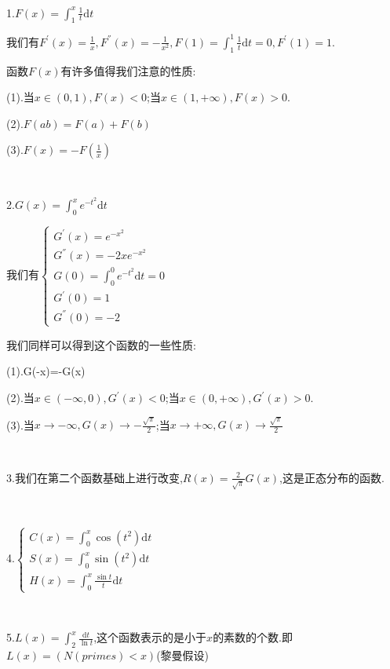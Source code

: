\documentclass[oneside]{book}
\begin{document}
	\hspace{\fill}\

	1.$F(x)=\int_{1}^{x}\frac{1}{t}\mathrm{d}t$
	
	我们有$F^{'}(x)=\frac{1}{x},F^{''}(x)=-\frac{1}{x^{2}},F(1)=\int_{1}^{1}\frac{1}{t}\mathrm{d}t=0,F^{'}(1)=1$.
	
	函数$F(x)$有许多值得我们注意的性质:
	
	(1).当$x\in \left(0,1 \right),F(x)<0$;当$x\in \left(1,+\infty \right),F(x)>0$.
	
	(2).$F(ab)=F(a)+F(b)$
	
	(3).$F(x)=-F(\frac{1}{x})$
	
	\hspace{\fill}\
	
	2.$G(x)=\int_{0}^{x}e^{-t^{2}}\mathrm{d}t$
	
	我们有$\left\lbrace \begin{array}{c}
		G^{'}(x)=e^{-x^{2}}\\
		G^{''}(x)=-2xe^{-x^{2}}\\
		G(0)=\int_{0}^{0}e^{-t^{2}}\mathrm{d}t=0\\
		G^{'}(0)=1\\G^{''}(0)=-2
	\end{array}\right. $

	我们同样可以得到这个函数的一些性质:
	
	(1).G(-x)=-G(x)
	
	(2).当$x\in \left( -\infty,0\right),G^{'}(x)<0$;当$x\in \left( 0,+\infty\right),G^{'}(x)>0$.
	
	(3).当$x\rightarrow -\infty,G(x)\rightarrow -\frac{\sqrt{\pi}}{2}$;当$x\rightarrow +\infty,G(x)\rightarrow \frac{\sqrt{\pi}}{2}$
	
	\hspace{\fill}\
	
	3.我们在第二个函数基础上进行改变,$R(x)=\frac{2}{\sqrt{\pi}}G(x)$,这是正态分布的函数.
	
	\hspace{\fill}\
	
	4.$\left\lbrace \begin{array}{c}
	C(x)=\int_{0}^{x}\cos(t^{2})\mathrm{d}t\\ S(x)=\int_{0}^{x}\sin(t^{2})\mathrm{d}t\\ H(x)=\int_{0}^{x}\frac{\sin t}{t}\mathrm{d}t	\end{array}\right. $

	\hspace{\fill}\
	
	5.$L(x)=\int_{2}^{x}\frac{\mathrm{d}t}{\ln t}$,这个函数表示的是小于$x$的素数的个数.即$L(x)=(N(primes)<x)$(黎曼假设)
\end{document}
